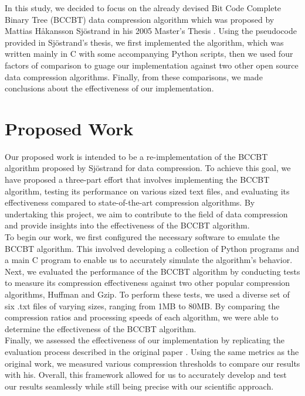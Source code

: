 \documentclass[12pt]{IEEEtran}
\begin{document}
In this study, we decided to focus on the already devised Bit Code Complete Binary Tree (BCCBT) data compression algorithm
which was
proposed by Mattias Håkansson Sjöstrand in his 2005 Master's Thesis \cite{Sjostrand}.
Using the pseudocode provided in
Sjöstrand's thesis, we first implemented the algorithm, which was written mainly in C with some accompanying Python scripts, then we used four factors of comparison
to guage our implementation against two other open source data compression algorithms. Finally, from these comparisons, we made conclusions about the effectiveness of our implementation.

\section{Proposed Work}
Our proposed work is intended to be a re-implementation of the BCCBT algorithm proposed by Sjöstrand for data compression. 
To achieve this goal, we have proposed a three-part effort that involves implementing the BCCBT algorithm, testing its performance on 
various sized text files, and evaluating its effectiveness compared to state-of-the-art compression algorithms. By undertaking this 
project, we aim to contribute to the field of data compression and provide insights into the effectiveness of the BCCBT algorithm. \\

To begin our work, we first configured the necessary software to emulate the BCCBT algorithm. This involved developing a collection of Python 
programs and a main C program to enable us to accurately simulate the algorithm's behavior.
Next, we evaluated the performance of the BCCBT algorithm by conducting tests to measure its 
compression effectiveness against two other popular compression algorithms, Huffman and Gzip. 
To perform these tests, we used a diverse set of six .txt files of varying sizes, ranging from 1MB to 80MB. 
By comparing the compression ratios and processing speeds of each algorithm, we were able to determine the effectiveness of the BCCBT algorithm. \\

Finally, we assessed the effectiveness of our implementation by replicating the evaluation process described in the original paper \cite{Sjostrand}. 
Using the same metrics as the original work, we measured various compression thresholds to compare our results with his. 
Overall, this framework allowed for us to accurately develop and test our results seamlessly while still being precise with our scientific approach.
\end{document}

